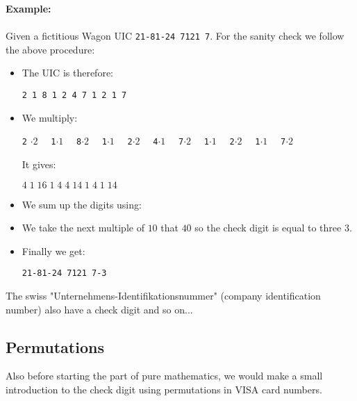 	\begin{tcolorbox}[colframe=black,colback=white,sharp corners]
	\textbf{{\Large {}}Example:}\\\\
	Given a fictitious Wagon UIC \texttt{21-81-24 7121 7}. For the sanity check we follow the above procedure:
	\begin{itemize}
		\item The UIC is therefore:
		\begin{center}
			 \texttt{2 1 8 1 2 4 7 1 2 1 7}
		\end{center}

		\item We multiply:
		\begin{center}
			 \texttt{2} $\cdot 2\quad$ \texttt{1}$\cdot 1\quad$ \texttt{8}$\cdot 2\quad$ \texttt{1}$\cdot 1\quad$ \texttt{2}$\cdot 2\quad$ \texttt{4}$\cdot 1\quad$ \texttt{7}$\cdot 2\quad$ \texttt{1}$\cdot 1\quad$ \texttt{2}$\cdot 2\quad$ \texttt{1}$\cdot 1\quad$ \texttt{7}$\cdot 2$
		\end{center}
		It gives:
		\begin{center}
			$4 \; 1\; 16 \; 1\; 4\; 4\; 14\; 1\; 4\; 1\; 14$
		\end{center}

		\item We sum up the digits using:
		
		
		\item We take the next multiple of $10$ that $40$ so the check digit is equal to three $3$.
		
		\item Finally we get:
		\begin{center}
			\texttt{21-81-24 7121 7-3}
		\end{center}
	\end{itemize}
	\end{tcolorbox}
	\begin{tcolorbox}[title=Remark,colframe=black,arc=10pt]
	The swiss "Unternehmens-Identifikationsnummer" (company identification number) also have a check digit and so on...
	\end{tcolorbox}
	
	
	\pagebreak
	\subsection{Permutations}
	Also before starting the part of pure mathematics, we would make a small introduction to the check digit using permutations in VISA card numbers.
	
